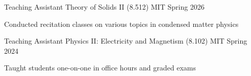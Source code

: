 

\begin{cventries}
\cventry
{Teaching Assistant} %
{Theory of Solids II (8.512)} %
{MIT} %
{Spring 2026} %
{
	\begin{cvitems} %
		\item{Conducted recitation classes on various topics in condensed matter physics}
	\end{cvitems}
}

\cventry
{Teaching Assistant} %
{Physics II: Electricity and Magnetism (8.102)} %
{MIT} %
{Spring 2024} %
{
	\begin{cvitems} %
		\item{Taught students one-on-one in office hours and graded exams}
	\end{cvitems}
}
\end{cventries}
